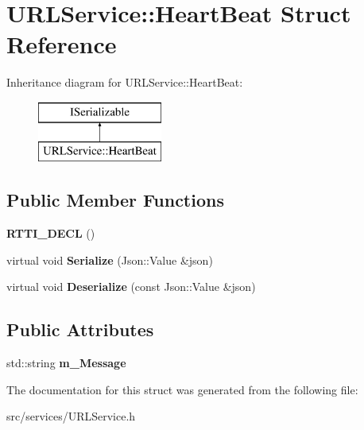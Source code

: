 \hypertarget{struct_u_r_l_service_1_1_heart_beat}{}\section{U\+R\+L\+Service\+:\+:Heart\+Beat Struct Reference}
\label{struct_u_r_l_service_1_1_heart_beat}
Inheritance diagram for U\+R\+L\+Service\+:\+:Heart\+Beat\+:\begin{figure}[H]
\begin{center}
\leavevmode
\includegraphics[height=2.000000cm]{struct_u_r_l_service_1_1_heart_beat}
\end{center}
\end{figure}
\subsection*{Public Member Functions}
\begin{DoxyCompactItemize}
\item 
\mbox{\label{struct_u_r_l_service_1_1_heart_beat_a91dc679a2d5b62cc1b50138f9ca38597}} 
{\bfseries R\+T\+T\+I\+\_\+\+D\+E\+CL} ()
\item 
\mbox{\label{struct_u_r_l_service_1_1_heart_beat_ab4e9922ab1726ea8ce54fc2857902400}} 
virtual void {\bfseries Serialize} (Json\+::\+Value \&json)
\item 
\mbox{\label{struct_u_r_l_service_1_1_heart_beat_aaea1f78fb0468727aeded5a1a18139d8}} 
virtual void {\bfseries Deserialize} (const Json\+::\+Value \&json)
\end{DoxyCompactItemize}
\subsection*{Public Attributes}
\begin{DoxyCompactItemize}
\item 
\mbox{\label{struct_u_r_l_service_1_1_heart_beat_ae320255ac196062c74cb48bf9cab3b54}} 
std\+::string {\bfseries m\+\_\+\+Message}
\end{DoxyCompactItemize}


The documentation for this struct was generated from the following file\+:\begin{DoxyCompactItemize}
\item 
src/services/U\+R\+L\+Service.\+h\end{DoxyCompactItemize}
